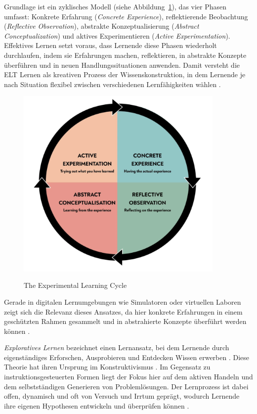 Grundlage ist ein zyklisches Modell (siehe Abbildung~\ref{fig:etl_cycle}), das vier Phasen umfasst: Konkrete Erfahrung (\textit{Concrete Experience}), reflektierende Beobachtung (\textit{Reflective Observation}), abstrakte Konzeptualisierung (\textit{Abstract Conceptualization}) und aktives Experimentieren (\textit{Active Experimentation}). Effektives Lernen setzt voraus, dass Lernende diese Phasen wiederholt durchlaufen, indem sie Erfahrungen machen, reflektieren, in abstrakte Konzepte überführen und in neuen Handlungssituationen anwenden. Damit versteht die ELT Lernen als kreativen Prozess der Wissenskonstruktion, in dem Lernende je nach Situation flexibel zwischen verschiedenen Lernfähigkeiten wählen \parencite[S.~2f]{mccarthy_experiential_2010}.

\begin{figure}[htbp]
    \centering
    \includegraphics[width=0.90\textwidth]{img/ELT_cycle.png}
    \caption{The Experimental Learning Cycle}
	\parencite{mcleod_kolbs_2025}
    \label{fig:etl_cycle}
\end{figure}

Gerade in digitalen Lernumgebungen wie Simulatoren oder virtuellen Laboren zeigt sich die Relevanz dieses Ansatzes, da hier konkrete Erfahrungen in einem geschützten Rahmen gesammelt und in abstrahierte Konzepte überführt werden können \parencites[S.~3182]{reyes_enhancing_2024}[S.~7]{bazie_effect_2024}.

\textit{Exploratives Lernen} bezeichnet einen Lernansatz, bei dem Lernende durch eigenständiges Erforschen, Ausprobieren und Entdecken Wissen erwerben \parencite[S.~15]{grabinger_rich_2016}. Diese Theorie hat ihren Ursprung im Konstruktivismus \parencite[S.~271]{kornelsen_expedition_2005}. Im Gegensatz zu instruktionsgesteuerten Formen liegt der Fokus hier auf dem aktiven Handeln und dem selbstständigen Generieren von Problemlösungen. Der Lernprozess ist dabei offen, dynamisch und oft von Versuch und Irrtum geprägt, wodurch Lernende ihre eigenen Hypothesen entwickeln und überprüfen können \parencite[S.~141]{lucke_strukturierte_2005}.

